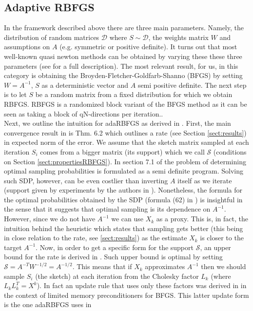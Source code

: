 \documentclass[12pt,conference,compsocconf]{IEEEtran}
\begin{document}
\subsection{Adaptive RBFGS}\label{sect:adadef}
In the framework described above there are three main parameters. Namely, the distribution of random matrices $\mathcal{D}$ where $S\sim \mathcal{D}$, the weights matrix $W$ and assumptions on $A$ (e.g. symmetric or  positive definite). It turns out that most well-known quasi newton methods can be obtained by varying these these three parameters (see \cite{Gower1} for a full description). The most relevant result, for us, in this category is obtaining the Broyden-Fletcher-Goldfarb-Shanno (BFGS) by setting $W=A^{-1}$, $S$ as a deterministic vector and $A$ semi positive definite. The next step is to let $S$ be a random matrix from a fixed distribution for which we obtain RBFGS. RBFGS is a randomized block variant of the BFGS method as it can be seen as taking a block of qN-directions per iteration..\\
Next, we outline the intuition for adaRBFGS as derived in \cite{Gower1}. First, the main convergence result in \cite{Gower1} is Thm. 6.2 which outlines a rate (see Section \ref{sect:results}) in expected norm of the error. We assume that the sketch matrix sampled at each iteration $S_i$ comes from a bigger matrix (its support) which we call $\mathcal{S}$ (conditions on Section \ref{sect:propertiesRBFGS}). In section 7.1 of \cite{Gower1} the problem of determining optimal sampling probabilities is formulated as a semi definite program. Solving such SDP, however, can be even costlier than inverting $A$ itself as we iterate (support given by experiments by the authors in \cite{Gower1}). Nonetheless, the formula for the optimal probabilities obtained by the SDP (formula (62) in \cite{Gower1}) is insightful in the sense that it suggests that optimal sampling is its dependence on $A^{-1}$. However, since we do not have $A^{-1}$ we can use $X_k$ as a proxy. This is, in fact, the intuition behind the heuristic which states that sampling gets better (this being in close relation to the rate, see \ref{sect:results}) as the estimate $X_k$ is closer to the target $A^{-1}$. Now, in order to get a specific form for the support $\mathcal{S}$, an upper bound for the rate is derived in \cite{Gower2}. Such upper bound is optimal by setting $\mathcal{S}=A^{-T}W^{-1/2}=A^{-1/2}$. This means that if $X_k$ approximates $A^{-1}$ then we should sample $S_i$ (the sketch) at each iteration from the Cholesky factor $L_k$ (where $L_kL_k^T=X^k$). In fact an update rule that uses only these factors was derived in \cite{Gratton} in the context of limited memory preconditioners for BFGS. This latter update form is the one adaRBFGS uses in \cite{Gower1}\\
\end{document}
